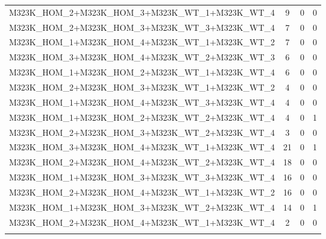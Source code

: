 \begin{table}[!htbp]
\begin{tabular}{@{\extracolsep{5pt}} cccc}
		M323K\_HOM\_2+M323K\_HOM\_3+M323K\_WT\_1+M323K\_WT\_4 & 9 & 0 & 0 \\ 
		M323K\_HOM\_2+M323K\_HOM\_3+M323K\_WT\_3+M323K\_WT\_4 & 7 & 0 & 0 \\ 
		M323K\_HOM\_1+M323K\_HOM\_4+M323K\_WT\_1+M323K\_WT\_2 & 7 & 0 & 0 \\ 
		M323K\_HOM\_3+M323K\_HOM\_4+M323K\_WT\_2+M323K\_WT\_3 & 6 & 0 & 0 \\ 
		M323K\_HOM\_1+M323K\_HOM\_2+M323K\_WT\_1+M323K\_WT\_4 & 6 & 0 & 0 \\ 
		M323K\_HOM\_2+M323K\_HOM\_3+M323K\_WT\_1+M323K\_WT\_2 & 4 & 0 & 0 \\ 
		M323K\_HOM\_1+M323K\_HOM\_4+M323K\_WT\_3+M323K\_WT\_4 & 4 & 0 & 0 \\ 
		M323K\_HOM\_1+M323K\_HOM\_2+M323K\_WT\_2+M323K\_WT\_4 & 4 & 0 & 1 \\ 
		M323K\_HOM\_2+M323K\_HOM\_3+M323K\_WT\_2+M323K\_WT\_4 & 3 & 0 & 0 \\ 
		M323K\_HOM\_3+M323K\_HOM\_4+M323K\_WT\_1+M323K\_WT\_4 & 21 & 0 & 1 \\ 
		M323K\_HOM\_2+M323K\_HOM\_4+M323K\_WT\_2+M323K\_WT\_4 & 18 & 0 & 0 \\ 
		M323K\_HOM\_1+M323K\_HOM\_3+M323K\_WT\_3+M323K\_WT\_4 & 16 & 0 & 0 \\ 
		M323K\_HOM\_2+M323K\_HOM\_4+M323K\_WT\_1+M323K\_WT\_2 & 16 & 0 & 0 \\ 
		M323K\_HOM\_1+M323K\_HOM\_3+M323K\_WT\_2+M323K\_WT\_4 & 14 & 0 & 1 \\ 
		M323K\_HOM\_2+M323K\_HOM\_4+M323K\_WT\_1+M323K\_WT\_4 & 2 & 0 & 0 \\ 
		\hline \\[-1.8ex] 
	\end{tabular} 
\end{table} 

